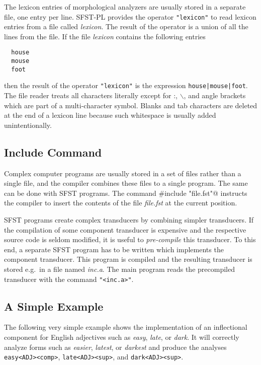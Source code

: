 \documentclass{article}
\begin{document}
The lexicon entries of morphological analyzers are usually stored in a
separate file, one entry per line. SFST-PL provides the operator
\verb#"lexicon"# to read lexicon entries from a file called
\emph{lexicon}. The result of the operator is a union of all the
lines from the file. If the file \emph{lexicon} contains the following
entries
\begin{verbatim}
  house
  mouse
  foot
\end{verbatim}
then the result of the operator \verb#"lexicon"# is the expression
\verb#house|mouse|foot#. The file reader treats all characters
literally except for :, $\backslash$, and angle brackets which are
part of a multi-character symbol. Blanks and tab characters are
deleted at the end of a lexicon line because such whitespace is
usually added unintentionally.


\subsection*{Include Command}

Complex computer programs are usually stored in a set of files rather
than a single file, and the compiler combines these files to a single
program. The same can be done with SFST programs. The command
\verb@#include "file.fst"@ instructs the compiler to insert the
contents of the file \emph{file.fst} at the current position.

SFST programs create complex transducers by combining simpler
transducers. If the compilation of some component transducer is
expensive and the respective source code is seldom modified, it is
useful to \emph{pre-compile} this transducer. To this end, a separate
SFST program has to be written which implements the component
transducer. This program is compiled and the resulting transducer is
stored e.g.\ in a file named \emph{inc.a}. The main program reads the
precompiled transducer with the command \verb#"<inc.a>"#.


\subsection*{A Simple Example}

The following very simple example shows the implementation of an
inflectional component for English adjectives such as \emph{easy},
\emph{late}, or \emph{dark}. It will correctly analyze forms such as
\emph{easier}, \emph{latest}, or \emph{darkest} and produce the
analyses \verb#easy<ADJ><comp>#, \verb#late<ADJ><sup>#, and
\verb#dark<ADJ><sup>#.
\end{document}
